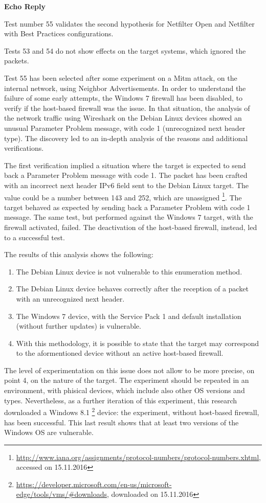 \documentclass[12pt]{article}
\begin{document}
\textbf{Echo Reply}

Test number 55 validates the second hypothesis for Netfilter Open and Netfilter with Best Practices configurations.

Tests 53 and 54 do not show effects on the target systems, which ignored the packets.

Test 55 has been selected after some experiment on a Mitm attack, on the internal network, using Neighbor Advertisements. In order to understand the failure of some early attempts, the Windows 7 firewall has been disabled, to verify if the host-based firewall was the issue.  In that situation, the analysis of the network traffic using Wireshark on the Debian Linux devices showed an unusual Parameter Problem message, with code 1 (unrecognized next header type). The discovery led to an in-depth analysis of the reasons and additional verifications.

The first verification implied a situation where the target is expected to send back a Parameter Problem message with code 1. The packet has been crafted with an incorrect next header IPv6 field sent to the Debian Linux target. The value could be a number between 143 and 252, which are unassigned \footnote{\url{http://www.iana.org/assignments/protocol-numbers/protocol-numbers.xhtml}, accessed on 15.11.2016}. The target behaved as expected by sending back a Parameter Problem with code 1 message. The same test, but performed against the Windows 7 target, with the firewall activated, failed. The deactivation of the host-based firewall, instead, led to a successful test. 

The results of this analysis shows the following:
\begin{enumerate}[noitemsep,topsep=0pt,partopsep=0pt]
 \item The Debian Linux device is not vulnerable to this enumeration method.
 \item The Debian Linux device behaves correctly after the reception of a packet with an unrecognized next header.
 \item The Windows 7 device, with the Service Pack 1 and default installation (without further updates) is vulnerable.
 \item With this methodology, it is possible to state that the target may correspond to the aformentioned device without an active host-based firewall.
\end{enumerate}

The level of experimentation on this issue does not allow to be more precise, on point 4, on the nature of the target. The experiment should be repeated in an environment, with phisical devices, which include also other OS versions and types. Nevertheless, as a further iteration of this experiment, this research downloaded a Windows 8.1 \footnote{\url{https://developer.microsoft.com/en-us/microsoft-edge/tools/vms/\#downloads}, downloaded on 15.11.2016} device: the experiment, without host-based firewall, has been successful. This last result shows that at least two versions of the Windows OS are vulnerable.
\end{document}
